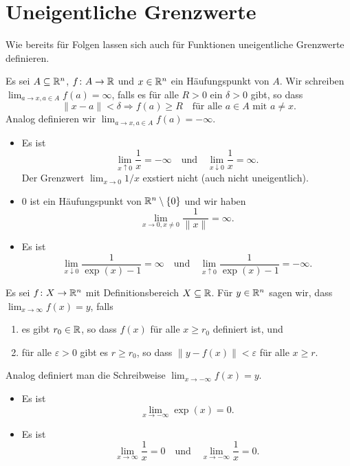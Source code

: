\documentclass[a4paper,10pt]{article}
\begin{document}
\section{Uneigentliche Grenzwerte}
Wie bereits für Folgen lassen sich auch für Funktionen uneigentliche Grenzwerte definieren.


\begin{defi}
 Es sei $A \subseteq \mathbb{R}^n$, $f \colon A \to \mathbb{R}$ und $x \in \mathbb{R}^n$ ein Häufungspunkt von $A$. Wir schreiben $\lim_{a \to x, a \in A} f(a) = \infty$, falls es für alle $R > 0$ ein $\delta > 0$ gibt, so dass
 \[
  \|x-a\| < \delta \Rightarrow f(a) \geq R \quad \text{für alle $a \in A$ mit $a \neq x$}.
 \]
 Analog definieren wir $\lim_{a \to x, a \in A} f(a) = -\infty.$
\end{defi}


\begin{bsp}
 \begin{itemize}
  \item
   Es ist
   \[
    \lim_{x \uparrow 0} \frac{1}{x} = -\infty
    \quad
    \text{und}
    \quad
    \lim_{x \downarrow 0} \frac{1}{x} = \infty.
   \]
   Der Grenzwert $\lim_{x \to 0} 1/x$ exstiert nicht (auch nicht uneigentlich).
  \item
   $0$ ist ein Häufungspunkt von $\mathbb{R}^n \setminus \{0\}$ und wir haben
   \[
    \lim_{x \to 0, x \neq 0} \frac{1}{\|x\|} = \infty.
   \]
  \item
   Es ist
   \[
    \lim_{x \downarrow 0} \frac{1}{\exp(x) - 1} = \infty
    \quad
    \text{und}
    \quad
    \lim_{x \uparrow 0} \frac{1}{\exp(x) - 1} = -\infty.
   \]
 \end{itemize}
\end{bsp}


\begin{defi}
 Es sei $f \colon X \to \mathbb{R}^n$  mit Definitionsbereich $X \subseteq \mathbb{R}$. Für $y \in \mathbb{R}^n$ sagen wir, dass $\lim_{x \to \infty} f(x) = y$, falls
 \begin{enumerate}
  \item
   es gibt $r_0 \in \mathbb{R}$, so dass $f(x)$ für alle $x \geq r_0$ definiert ist, und
  \item
   für alle $\varepsilon > 0$ gibt es $r \geq r_0$, so dass $\|y - f(x)\| < \varepsilon$ für alle $x \geq r$.
 \end{enumerate}
 Analog definiert man die Schreibweise $\lim_{x \to -\infty} f(x) = y$.
\end{defi}


\begin{bsp}
 \begin{itemize}
  \item
   Es ist
   \[
    \lim_{x \to -\infty} \exp(x) = 0.
   \]
  \item
   Es ist
   \[
    \lim_{x \to \infty} \frac{1}{x} = 0
    \quad
    \text{und}
    \quad
    \lim_{x \to -\infty} \frac{1}{x} = 0.
   \]
 \end{itemize}
\end{bsp}
\end{document}
